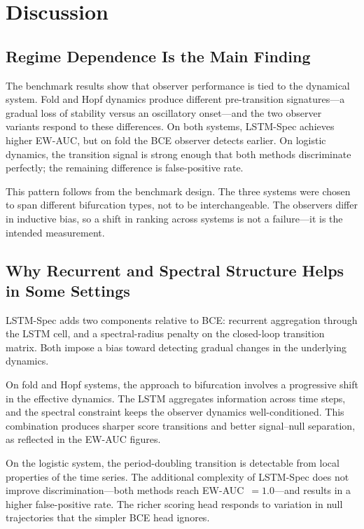 \section{Discussion}
\label{sec:discussion}

\subsection{Regime Dependence Is the Main Finding}
\label{sec:discussion:regime}

The benchmark results show that observer performance is tied to the dynamical
system. Fold and Hopf dynamics produce different pre-transition signatures---a
gradual loss of stability versus an oscillatory onset---and the two observer
variants respond to these differences. On both systems, LSTM-Spec achieves
higher EW-AUC, but on fold the BCE observer detects earlier. On logistic
dynamics, the transition signal is strong enough that both methods discriminate
perfectly; the remaining difference is false-positive rate.

This pattern follows from the benchmark design. The three systems were chosen to
span different bifurcation types, not to be interchangeable. The observers
differ in inductive bias, so a shift in ranking across systems is not a
failure---it is the intended measurement.

\subsection{Why Recurrent and Spectral Structure Helps in Some Settings}
\label{sec:discussion:spectral}

LSTM-Spec adds two components relative to BCE: recurrent aggregation through
the LSTM cell, and a spectral-radius penalty on the closed-loop transition
matrix. Both impose a bias toward detecting gradual changes in the underlying
dynamics.

On fold and Hopf systems, the approach to bifurcation involves a progressive
shift in the effective dynamics. The LSTM aggregates information across time
steps, and the spectral constraint keeps the observer dynamics well-conditioned.
This combination produces sharper score transitions and better signal--null
separation, as reflected in the EW-AUC figures.

On the logistic system, the period-doubling transition is detectable from local
properties of the time series. The additional complexity of LSTM-Spec does not
improve discrimination---both methods reach EW-AUC~\(= 1.0\)---and results in a
higher false-positive rate. The richer scoring head responds to variation in
null trajectories that the simpler BCE head ignores.

